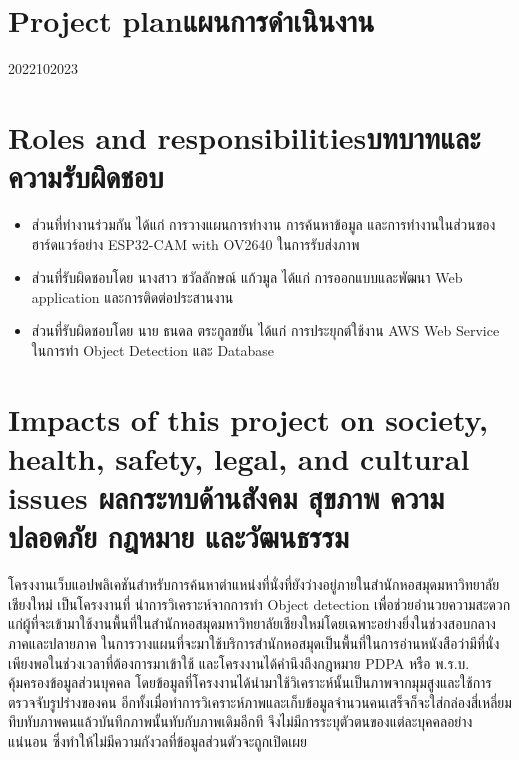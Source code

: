 \section{\ifenglish Project plan\else แผนการดำเนินงาน\fi}

\begin{plan}{11}{2022}{10}{2023}
\end{plan}

\section{\ifenglish Roles and responsibilities\else บทบาทและความรับผิดชอบ\fi}
\begin{itemize}
\item ส่วนที่ทำงานร่วมกัน ได้แก่ การวางแผนการทำงาน การค้นหาข้อมูล และการทำงานในส่วนของฮาร์ดแวร์อย่าง ESP32-CAM with OV2640 ในการรับส่งภาพ
\item ส่วนที่รับผิดชอบโดย นางสาว ชวัลลักษณ์ แก้วมูล ได้แก่ การออกแบบและพัฒนา Web application และการติดต่อประสานงาน
\item ส่วนที่รับผิดชอบโดย นาย ธนดล ตระกูลขยัน ได้แก่ การประยุกต์ใช้งาน AWS Web Service ในการทำ Object Detection และ Database
\end{itemize}
\section{\ifenglish%
Impacts of this project on society, health, safety, legal, and cultural issues
\else%
ผลกระทบด้านสังคม สุขภาพ ความปลอดภัย กฎหมาย และวัฒนธรรม
\fi}
โครงงานเว็บแอปพลิเคชันสำหรับการค้นหาตำแหน่งที่นั่งที่ยังว่างอยู่ภายในสำนักหอสมุดมหาวิทยาลัยเชียงใหม่ เป็นโครงงานที่
นำการวิเคราะห์จากการทำ Object detection เพื่อช่วยอำนวยความสะดวกแก่ผู้ที่จะเข้ามาใช้งานพื้นที่ในสำนักหอสมุดมหาวิทยาลัยเชียงใหม่โดยเฉพาะอย่างยิ่งในช่วงสอบกลางภาคและปลายภาค
ในการวางแผนที่จะมาใช้บริการสำนักหอสมุดเป็นพื้นที่ในการอ่านหนังสือว่ามีที่นั่งเพียงพอในช่วงเวลาที่ต้องการมาเข้าใช้ และโครงงานได้คำนึงถึงกฎหมาย PDPA หรือ พ.ร.บ. คุ้มครองข้อมูลส่วนบุคคล\cite{PDPA} 
โดยข้อมูลที่โครงงานได้นำมาใช้วิเคราะห์นั้นเป็นภาพจากมุมสูงและใช้การตรวจจับรูปร่างของคน อีกทั้งเมื่อทำการวิเคราะห์ภาพและเก็บข้อมูลจำนวนคนเสร็จก็จะใส่กล่องสี่เหลี่ยมทึบทับภาพคนแล้วบันทึกภาพนั้นทับกับภาพเดิมอีกที จึงไม่มีการระบุตัวตนของแต่ละบุคคลอย่างแน่นอน
ซึ่งทำให้ไม่มีความกังวลที่ข้อมูลส่วนตัวจะถูกเปิดเผย
